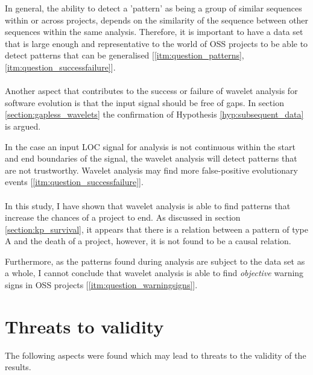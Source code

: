 In general, the ability to detect a 'pattern' as being a group of similar
sequences within or across projects, depends on the similarity of the sequence
between other sequences within the same analysis. Therefore, it is important to
have a data set that is large enough and representative to the world of OSS
projects to be able to detect patterns that can be generalised
[\ref{itm:question_patterns}, \ref{itm:question_successfailure}].

\paragraph{}
Another aspect that contributes to the success or failure of wavelet analysis
for software evolution is that the input signal should be free of gaps. In
section \ref{section:gapless_wavelets} the confirmation of Hypothesis
\ref{hyp:subsequent_data} is argued.

In the case an input LOC signal for analysis is not continuous within the start
and end boundaries of the signal, the wavelet analysis will detect patterns
that are not trustworthy. Wavelet analysis may find more false-positive
evolutionary events [\ref{itm:question_successfailure}].

\paragraph{}
In this study, I have shown that wavelet analysis is able to find patterns that
increase the chances of a project to end. As discussed in section
\ref{section:kp_survival}, it appears that there is a relation between a
pattern of type A and the death of a project, however, it is not found to be a
causal relation.

Furthermore, as the patterns found during analysis are subject to the data set
as a whole, I cannot conclude that wavelet analysis is able to find
\emph{objective }\rm warning signs in OSS projects
[\ref{itm:question_warningsigns}].

\section{Threats to validity}
The following aspects were found which may lead to threats to the validity of
the results.

